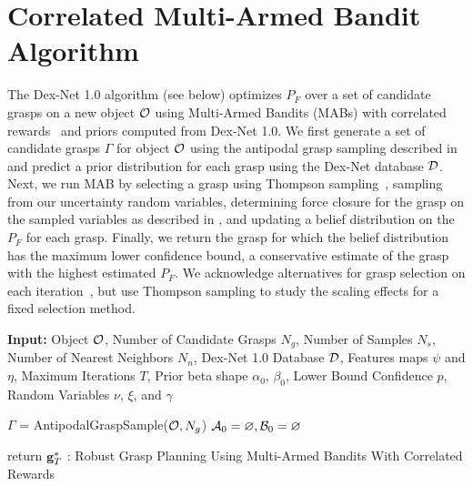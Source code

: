 \section{Correlated Multi-Armed Bandit Algorithm}
The Dex-Net 1.0 algorithm (see below) optimizes $P_F$ over a set of candidate grasps on a new object $\mathcal{O}$ using Multi-Armed Bandits (MABs) with correlated rewards~\cite{hoffman2013exploiting, pandey2007multi} and priors computed from Dex-Net 1.0.
We first generate a set of candidate grasps $\Gamma$ for object $\mathcal{O}$ using the antipodal grasp sampling described in  and predict a prior distribution for each grasp using the Dex-Net database $\mathcal{D}$.
Next, we run MAB by selecting a grasp using Thompson sampling~\cite{laskey2015bandits, oberlin2015autonomously}, sampling from our uncertainty random variables, determining force closure for the grasp on the sampled variables as described in , and updating a belief distribution on the $P_F$ for each grasp.
Finally, we return the grasp for which the belief distribution has the maximum lower confidence bound, a conservative estimate of the grasp with the highest estimated $P_F$.
We acknowledge alternatives for grasp selection on each iteration~\cite{kroemer2010combining, laskey2015bandits, montesano2012active, oberlin2015autonomously}, but use Thompson sampling to study the scaling effects for a fixed selection method.

\begin{algorithm}
{\small
    \SetAlgoLined
    {\bf Input:} Object $\mathcal{O}$, Number of Candidate Grasps $N_g$, Number of Samples $N_s$, Number of Nearest Neighbors $N_n$, Dex-Net 1.0 Database $\mathcal{D}$, Features maps $\psi$ and $\eta$,  Maximum Iterations $T$, Prior beta shape $\alpha_0$, $\beta_0$, Lower Bound Confidence $p$, Random Variables $\nu$, $\xi$, and $\gamma$ \\
    
	$\Gamma$ = AntipodalGraspSample($\mathcal{O}, N_g$) \;
	$\mathcal{A}_0 = \varnothing, \mathcal{B}_0 = \varnothing$\;
	
	return $\mathbf{g}_T^*$\;
    : Robust Grasp Planning Using Multi-Armed Bandits With Correlated Rewards
    \label{alg:full}
}
\end{algorithm}

